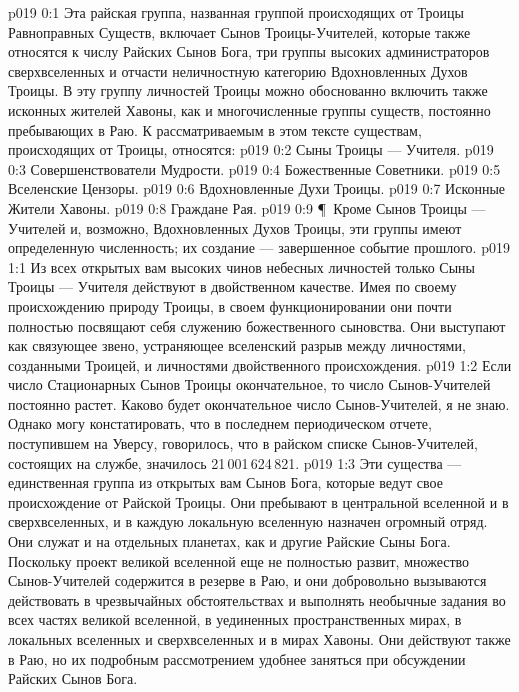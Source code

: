 \vs p019 0:1 Эта райская группа, названная группой происходящих от Троицы Равноправных Существ, включает Сынов Троицы\hyp{}Учителей, которые также относятся к числу Райских Сынов Бога, три группы высоких администраторов сверхвселенных и отчасти неличностную категорию Вдохновленных Духов Троицы. В эту группу личностей Троицы можно обоснованно включить также исконных жителей Хавоны, как и многочисленные группы существ, постоянно пребывающих в Раю. К рассматриваемым в этом тексте существам, происходящих от Троицы, относятся:
\vs p019 0:2 \bibnobreakspace Сыны Троицы --- Учителя.
\vs p019 0:3 \bibnobreakspace Совершенствователи Мудрости.
\vs p019 0:4 \bibnobreakspace Божественные Советники.
\vs p019 0:5 \bibnobreakspace Вселенские Цензоры.
\vs p019 0:6 \bibnobreakspace Вдохновленные Духи Троицы.
\vs p019 0:7 \bibnobreakspace Исконные Жители Хавоны.
\vs p019 0:8 \bibnobreakspace Граждане Рая.
\vs p019 0:9 \P\ Кроме Сынов Троицы --- Учителей и, возможно, Вдохновленных Духов Троицы, эти группы имеют определенную численность; их создание --- завершенное событие прошлого.
\vs p019 1:1 Из всех открытых вам высоких чинов небесных личностей только Сыны Троицы --- Учителя действуют в двойственном качестве. Имея по своему происхождению природу Троицы, в своем функционировании они почти полностью посвящают себя служению божественного сыновства. Они выступают как связующее звено, устраняющее вселенский разрыв между личностями, созданными Троицей, и личностями двойственного происхождения.
\vs p019 1:2 Если число Стационарных Сынов Троицы окончательное, то число Сынов\hyp{}Учителей постоянно растет. Каково будет окончательное число Сынов\hyp{}Учителей, я не знаю. Однако могу констатировать, что в последнем периодическом отчете, поступившем на Уверсу, говорилось, что в райском списке Сынов\hyp{}Учителей, состоящих на службе, значилось 21\,001\,624\,821.
\vs p019 1:3 Эти существа --- единственная группа из открытых вам Сынов Бога, которые ведут свое происхождение от Райской Троицы. Они пребывают в центральной вселенной и в сверхвселенных, и в каждую локальную вселенную назначен огромный отряд. Они служат и на отдельных планетах, как и другие Райские Сыны Бога. Поскольку проект великой вселенной еще не полностью развит, множество Сынов\hyp{}Учителей содержится в резерве в Раю, и они добровольно вызываются действовать в чрезвычайных обстоятельствах и выполнять необычные задания во всех частях великой вселенной, в уединенных пространственных мирах, в локальных вселенных и сверхвселенных и в мирах Хавоны. Они действуют также в Раю, но их подробным рассмотрением удобнее заняться при обсуждении Райских Сынов Бога.
